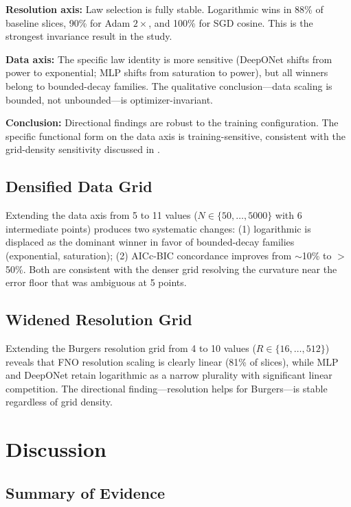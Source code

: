 \documentclass[11pt]{article}
\begin{document}
\textbf{Resolution axis:} Law selection is fully stable.
Logarithmic wins in 88\% of baseline slices, 90\% for Adam
$2\times$, and 100\% for SGD cosine. This is the strongest
invariance result in the study.

\textbf{Data axis:} The specific law identity is more sensitive
(DeepONet shifts from power to exponential; MLP shifts from
saturation to power), but all winners belong to bounded-decay
families. The qualitative conclusion---data scaling is bounded,
not unbounded---is optimizer-invariant.

\textbf{Conclusion:} Directional findings are robust to the
training configuration. The specific functional form on the data
axis is training-sensitive, consistent with the grid-density
sensitivity discussed in .

\subsection{Densified Data Grid}
\label{sec:dense-n}

Extending the data axis from 5 to 11 values
($N \in \{50, \ldots, 5000\}$ with 6 intermediate points) produces
two systematic changes: (1) logarithmic is displaced as the dominant
winner in favor of bounded-decay families (exponential, saturation);
(2) AICc-BIC concordance improves from $\sim$10\% to $>$50\%.
Both are consistent with the denser grid resolving the curvature
near the error floor that was ambiguous at 5 points.

\subsection{Widened Resolution Grid}
\label{sec:wide-r}

Extending the Burgers resolution grid from 4 to 10 values
($R \in \{16, \ldots, 512\}$) reveals that FNO resolution scaling
is clearly linear (81\% of slices), while MLP and DeepONet retain
logarithmic as a narrow plurality with significant linear
competition. The directional finding---resolution helps for
Burgers---is stable regardless of grid density.


\section{Discussion}
\label{sec:discussion}

\subsection{Summary of Evidence}
\end{document}
